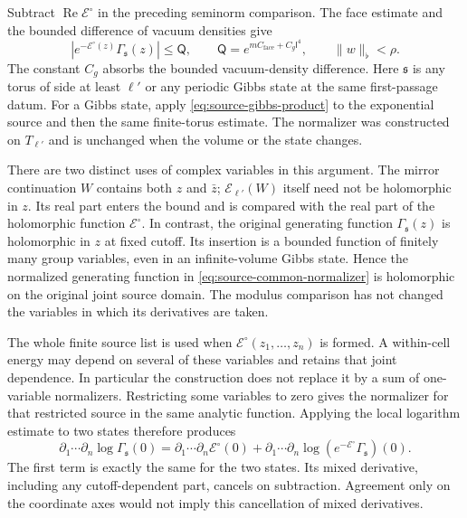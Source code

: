 \documentclass[11pt,letterpaper,reqno]{amsart}
\theoremstyle{definition}
\theoremstyle{remark}
\begin{document}
Subtract $\operatorname{Re}\mathcal E^\circ$ in the preceding
seminorm comparison. The face estimate and the bounded difference of
vacuum densities give
\begin{equation}\label{eq:source-common-normalizer}
 |e^{-\mathcal E^\circ(z)}\Gamma_{\mathfrak s}(z)|
       \le\mathsf Q,
 \qquad \mathsf Q=e^{mC_{\mathrm{face}}+C_g\mathsf l^4},
 \qquad \|w\|_\flat<\rho.
\end{equation}
The constant $C_g$ absorbs the bounded vacuum-density difference.
Here $\mathfrak s$ is any torus of side at least $\ell'$ or any
periodic Gibbs state at the same first-passage datum. For a Gibbs
state, apply \eqref{eq:source-gibbs-product} to the exponential
source and then the same finite-torus estimate. The normalizer was
constructed on $T_{\ell'}$ and is unchanged when the volume or the
state changes.

There are two distinct uses of complex variables in this argument.
The mirror continuation $W$ contains both $z$ and $\bar z$;
$\mathcal E_{\ell'}(W)$ itself need not be holomorphic in $z$.
Its real part enters the bound and is compared with the real part
of the holomorphic function $\mathcal E^\circ$. In contrast,
the original generating function $\Gamma_{\mathfrak s}(z)$ is
holomorphic in $z$ at fixed cutoff. Its insertion is a bounded
function of finitely many group variables, even in an infinite-volume
Gibbs state. Hence the normalized generating function in
\eqref{eq:source-common-normalizer} is holomorphic on the original
joint source domain. The modulus comparison has not changed the
variables in which its derivatives are taken.

The whole finite source list is used when
$\mathcal E^\circ(z_1,\ldots,z_n)$ is formed. A within-cell
energy may depend on several of these variables and retains that
joint dependence. In particular the construction does not replace
it by a sum of one-variable normalizers. Restricting some variables
to zero gives the normalizer for that restricted source in the same
analytic function. Applying the local logarithm estimate to two
states therefore produces
\[
 \partial_1\cdots\partial_n\log\Gamma_{\mathfrak s}(0)
  =\partial_1\cdots\partial_n\mathcal E^\circ(0)
       +\partial_1\cdots\partial_n
          \log(e^{-\mathcal E^\circ}\Gamma_{\mathfrak s})(0).
\]
The first term is exactly the same for the two states. Its mixed
derivative, including any cutoff-dependent part, cancels on
subtraction. Agreement only on the coordinate axes would not imply
this cancellation of mixed derivatives.
\end{document}
